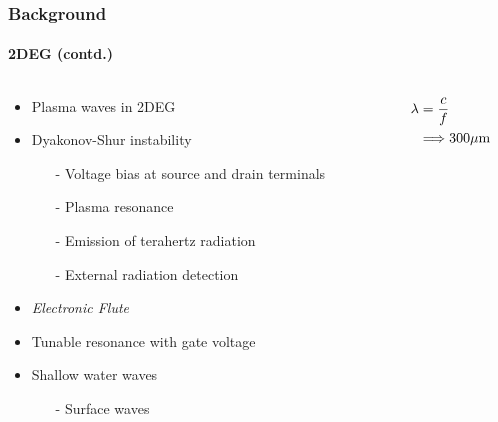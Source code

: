 \documentclass[mathserif,18pt,xcolor=table]{beamer}
\begin{document}
\begin{frame}
  \frametitle{Background}
  \framesubtitle{2DEG (contd.)}

  \begin{columns} %
    \begin{column}{.5\textwidth}
      \begin{minipage}[T][.1\textheight][c]{\linewidth}
        \begin{itemize}
          \item Plasma waves in 2DEG
          \item Dyakonov-Shur instability
          \begin{itemize}
            \item[-]{Voltage bias at source and drain terminals}
            \item[-]{Plasma resonance}
            \item[-]{Emission of terahertz radiation}
            \item[-]{External radiation detection}
          \end{itemize}
          \item \emph{Electronic Flute}
          \item Tunable resonance with gate voltage
          \item Shallow water waves
          \begin{itemize}
            \item[-]{\color{red}Surface waves}
          \end{itemize}
        \end{itemize}
      \end{minipage}
    \end{column}
    \begin{column}{.5\textwidth}
      \begin{figure}
        \def\svgwidth{\linewidth}
        
      \end{figure}
      \begin{equation} \nonumber
        \begin{split}
          \lambda &= \frac{c}{f} \\
          & \Longrightarrow  300 \mu \mathrm{m}
        \end{split}
        \label{eq:disp_TE_two}
      \end{equation}
      \end{column}%
    \end{columns}
  \end{frame}
\end{document}

